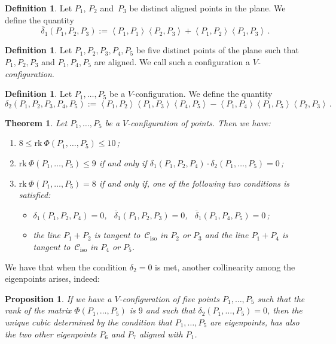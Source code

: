 \documentclass[11pt, a4paper, reqno, captions=tableheading,bibliography=totoc]{scrartcl}
\theoremstyle{plain}
\newtheorem{prop}[lemma]{Proposition}
\newtheorem{theorem}[lemma]{Theorem}
\theoremstyle{definition}
\newtheorem{definition}[lemma]{Definition}
\newcommand{\iso}{\mathcal{C}_{\mathrm{iso}}}
\newcommand{\scl}[2]{\left\langle {#1}, {#2} \right\rangle}
\newcommand{\rk}{\ensuremath{\mathrm{rk}}}
\begin{document}
\begin{definition}
\label{definition:delta1b}
 Let $P_1$, $P_2$ and~$P_3$ be distinct aligned points in the plane.
 We define the quantity
 \[
  \overline{\delta}_1(P_1, P_2, P_3) :=
  \scl{P_1}{P_1} \scl{P_2}{P_3} + \scl{P_1}{P_2}\scl{P_1}{P_3} \,.
  \]
\end{definition}

\begin{definition}
\label{Vconf}
Let $P_1, P_2, P_3, P_4, P_5$ be five distinct points of the plane
such that $P_1, P_2, P_3$ and $P_1, P_4, P_5$ are aligned.
We call such a configuration a \emph{$V$-configuration}.
\end{definition}

\begin{definition}
 Let $P_1, \dots, P_5$ be a $V$-configuration.
We define the quantity
 \[
  \delta_2(P_1, P_2, P_3, P_4, P_5) :=
  \scl{P_1}{P_2} \scl{P_1}{P_3} \scl{P_4}{P_5} -
  \scl{P_1}{P_4} \scl{P_1}{P_5} \scl{P_2}{P_3} \,.
 \]
\end{definition}

\begin{theorem}
\label{theorem:rank_V}
Let $P_1, \dots, P_5$ be a $V$-configuration of
points. Then we have:
\begin{enumerate}
\item $8 \leq \rk \ \Phi(P_1, \dots, P_5) \leq 10$\,;
\item $\rk \ \Phi(P_1, \dots, P_5) \leq 9$ if and only if
$\delta_1(P_1, P_2, P_4) \cdot \delta_2(P_1, \dots, P_5) =0$\,;
\item $\rk \ \Phi(P_1, \dots, P_5) = 8$ if and only if, one of
the following two conditions is satisfied:
%
\begin{itemize}
\item $\delta_1(P_1, P_2, P_4) = 0$, \
$\overline{\delta}_1(P_1, P_2, P_3) = 0$,
\ $\overline{\delta}_1(P_1, P_4, P_5) = 0$\,;
  \item the line $P_1+P_2$ is tangent to~$\iso$ in $P_2$ or $P_3$
and the line $P_1+P_4$ is tangent to~$\iso$ in $P_4$ or $P_5$.
\end{itemize}
%
\end{enumerate}
\end{theorem}

We have that when the condition $\delta_2 = 0$ is met, another collinearity among the eigenpoints arises, indeed:

\begin{prop}
\label{proposition:terzo_allineamento}
If we have a $V$-configuration of five points $P_1, \dots, P_5$
such that the rank of the matrix $\Phi(P_1, \dots, P_5)$ is $9$ and
such that $\delta_2(P_1, \dots, P_5) = 0$,
then the unique cubic determined by the condition that $P_1, \dots, P_5$
are eigenpoints, has also the two other eigenpoints $P_6$ and $P_7$
aligned with $P_1$.
\end{prop}
\end{document}
